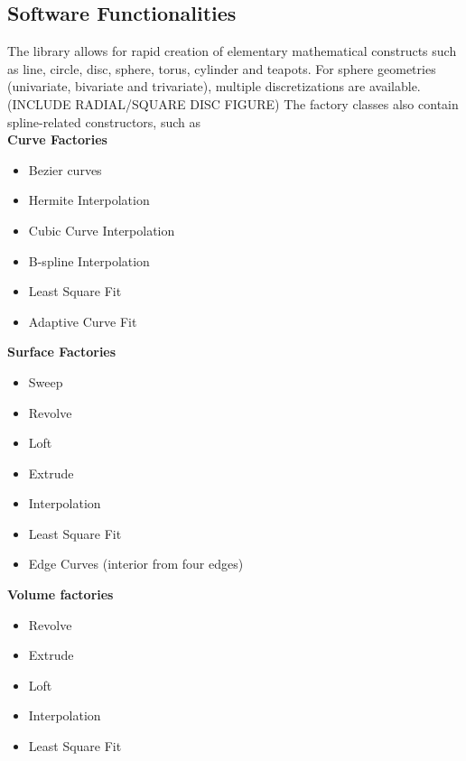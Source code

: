 \documentclass[preprint,12pt, a4paper]{elsarticle}
\begin{document}
\subsection{Software Functionalities}
\label{sec:functionality}

The library allows for rapid creation of elementary mathematical constructs such as line, circle, disc, sphere, torus, cylinder and teapots.
For sphere geometries (univariate, bivariate and trivariate), multiple discretizations are available.
(INCLUDE RADIAL/SQUARE DISC FIGURE)
The factory classes also contain spline-related constructors, such as \\
\textbf{Curve Factories}
\begin{itemize}
    \setlength\itemsep{-.5em}
    \item Bezier curves
    \item Hermite Interpolation
    \item Cubic Curve Interpolation
    \item B-spline Interpolation
    \item Least Square Fit
    \item Adaptive Curve Fit
\end{itemize}
\textbf{Surface Factories}
\begin{itemize}
    \setlength\itemsep{-.5em}
    \item Sweep
    \item Revolve
    \item Loft
    \item Extrude
    \item Interpolation
    \item Least Square Fit
    \item Edge Curves (interior from four edges)
\end{itemize}
\textbf{Volume factories}
\begin{itemize}
    \setlength\itemsep{-.5em}
    \item Revolve
    \item Extrude
    \item Loft
    \item Interpolation
    \item Least Square Fit
\end{itemize}
\end{document}
